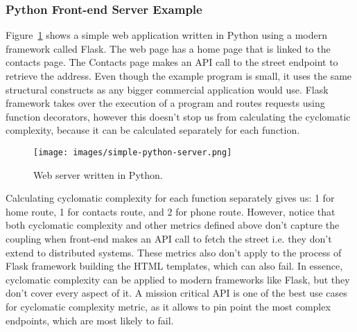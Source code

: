 \documentclass[12pt]{article}
\begin{document}
\subsubsection{Python Front-end Server Example}
Figure~\ref{fig:simple-python-server} shows a simple web application written in Python using a modern framework called Flask. The web page has a home page that is linked to the contacts page. The Contacts page makes an API call to the street endpoint to retrieve the address. Even though the example program is small, it uses the same structural constructs as any bigger commercial application would use. Flask framework takes over the execution of a program and routes requests using function decorators, however this doesn't stop us from calculating the cyclomatic complexity, because it can be calculated separately for each function.
\begin{figure}[H]
    \centering
    \texttt{[image: images/simple-python-server.png]}
    \caption{Web server written in Python.}
    \label{fig:simple-python-server}
\end{figure}
Calculating cyclomatic complexity for each function separately gives us: 1 for home route, 1 for contacts route, and 2 for phone route. However, notice that both cyclomatic complexity and other metrics defined above don't capture the coupling when front-end makes an API call to fetch the street i.e. they don't extend to distributed systems. These metrics also don't apply to the process of Flask framework building the HTML templates, which can also fail. In essence, cyclomatic complexity can be applied to modern frameworks like Flask, but they don't cover every aspect of it. A mission critical API is one of the best use cases for cyclomatic complexity metric, as it allows to pin point the most complex endpoints, which are most likely to fail.
\end{document}
